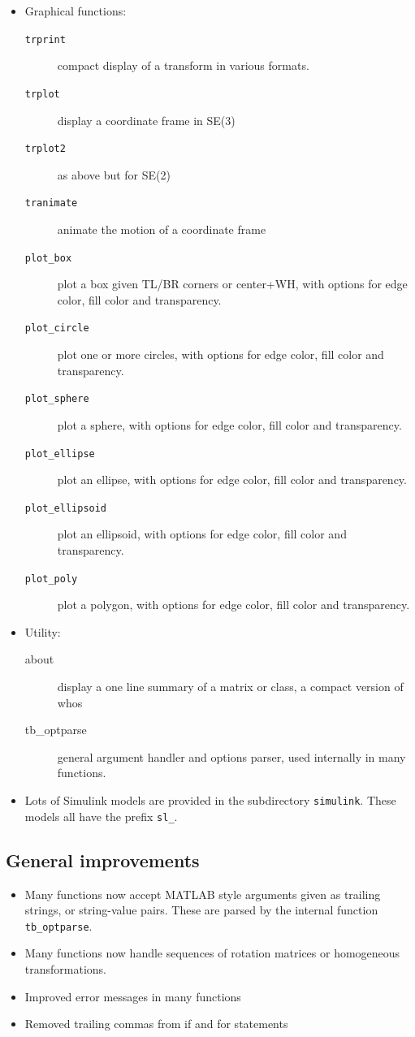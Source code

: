 \documentclass[a4paper]{report}
\begin{document}
\begin{itemize}
\item Graphical functions:
  \begin{description}
 \item[\texttt{trprint}] compact display of a transform in various formats.
\item[\texttt{trplot}] display a coordinate frame in SE(3)
\item[\texttt{trplot2}] as above but for SE(2)
\item[\texttt{tranimate}] animate the motion of a coordinate frame
\item[\texttt{plot\_box}] plot a box given TL/BR corners or center+WH, with options for edge color, fill color and transparency.
\item[\texttt{plot\_circle}] plot one or more circles, with options for edge color, fill color and transparency.
\item[\texttt{plot\_sphere}] plot a sphere, with options for edge color, fill color and transparency.
\item[\texttt{plot\_ellipse}] plot an ellipse, with options for edge color, fill color and transparency.
\item[\texttt{plot\_ellipsoid}] plot an ellipsoid, with options for edge color, fill color and transparency.
\item[\texttt{plot\_poly}] plot a polygon, with options for edge color, fill color and transparency.
 \end{description}
 
 \item Utility:
  \begin{description}
\item[about] display a one line summary of a matrix or class, a compact version of whos
\item[tb\_optparse] general argument handler and options parser, used internally in many functions.
\end{description}
\item Lots of Simulink models are provided in the subdirectory \texttt{simulink}.  These models all have the prefix \texttt{sl\_}.
\end{itemize}

\subsection{General improvements}
\begin{itemize}
\item Many functions now accept MATLAB style arguments given as trailing strings, or string-value pairs.  These are parsed by the internal
function \texttt{tb\_optparse}.
\item Many functions now handle sequences of rotation matrices or homogeneous transformations.
\item Improved error messages in many functions
\item Removed trailing commas from if and for statements
\end{itemize}
\end{document}
